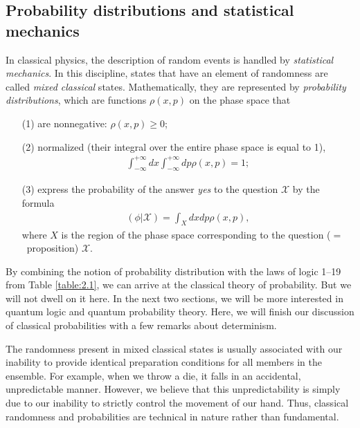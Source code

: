 \documentclass[nochecklpage]{stefan1}
\theoremstyle{definition}
\begin{document}
\subsection{Probability distributions and statistical mechanics}\label{sc:1.1.3}
In classical physics, the description of random events is handled by
\emph{statistical mechanics}. In this
discipline, states that have an element of randomness are called
\emph{mixed classical} states. Mathematically, they are
represented by \emph{probability distributions},
 which are functions $ \rho (x,p) $ on
the phase space that
%
%
\begin{enumerate}
\item[(1)]
are nonnegative: $ \rho (x,p) \geq 0$;
\item[(2)]
normalized (their integral over the entire phase space is equal to 1),
%
\begin{align*}
\int_{-\infty }^{+\infty } dx \int_{-\infty }^{+\infty
} dp \rho (x,p) =
1;
\end{align*}
\item[(3)]
express the probability of the answer \emph{yes} to the question $ \mathcal{X} $
 by the formula
\begin{align}
(\phi | \mathcal{X}) = \int_{X} dx dp \rho (x,p), \label{eq:prob-sum}
\end{align}
%
where $ X $ is the region of the phase space corresponding to the
question ($=$~proposition) $\mathcal{X}$.
\end{enumerate}
%
By combining the notion of probability distribution with the laws of
logic 1--19 from Table \ref{table:2.1}, we can arrive at the classical
theory of probability. But we will not dwell on it here. In the next two
sections, we will be more interested in quantum logic and quantum
probability theory. Here, we will finish our discussion of classical
probabilities with a few remarks about determinism.

The randomness present in mixed classical states is usually associated
with our inability to provide identical preparation conditions for all
members in the ensemble. For example, when we throw a die, it falls in
an accidental, unpredictable manner. However, we believe that this
unpredictability is simply due to our inability to strictly control the
movement of our hand. Thus, classical randomness and probabilities are
technical in nature rather than fundamental.
\end{document}
